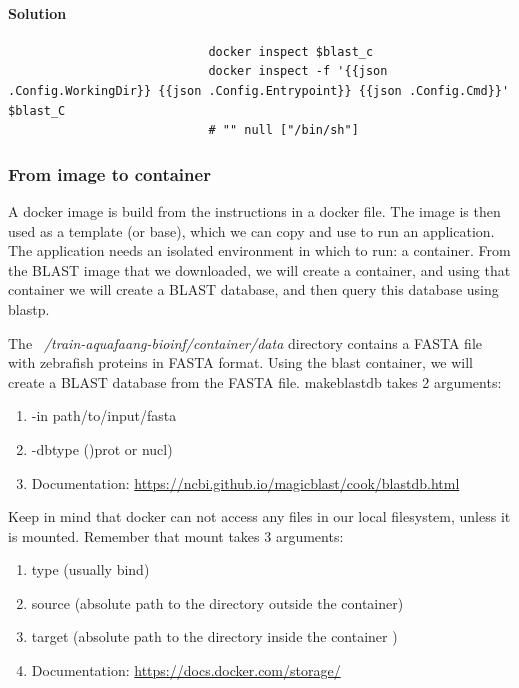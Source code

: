 \documentclass[12pt]{article}
\begin{document}
				\paragraph{Solution}	
					
					\begin{minipage}{\linewidth}
						\begin{lstlisting}
							docker inspect $blast_c 
							docker inspect -f '{{json .Config.WorkingDir}} {{json .Config.Entrypoint}} {{json .Config.Cmd}}' $blast_C
							# "" null ["/bin/sh"]
						\end{lstlisting}
				\end{minipage}
		
			\subsubsection{From image to container}		
				A docker image is build from the instructions in a docker file.  			
				The image is then used as a template (or base), which we can copy and use to run an application. 
				The application needs an isolated environment in which to run: a container.
				From the BLAST image that we downloaded, we will create a container, and using that container we will create a BLAST database, and then query this database using blastp.
					
				The \textit{~/train-aquafaang-bioinf/container/data} directory contains a FASTA file with zebrafish proteins in FASTA format. 
				Using the blast container, we will create a BLAST database from the FASTA file.
				makeblastdb takes 2 arguments: 
				
				\begin{enumerate}
					\item -in path/to/input/fasta  
					\item -dbtype ()prot or nucl)
					\item Documentation: \url{https://ncbi.github.io/magicblast/cook/blastdb.html}
				\end{enumerate}
				
				Keep in mind that docker can not access any files in our local filesystem, unless it is mounted. 
				Remember that mount takes 3 arguments: 
				\begin{enumerate}
					\item type (usually bind)  
					\item source (absolute path to the directory outside the container)
					\item target (absolute path to the directory inside the container )
					\item Documentation:  \url{https://docs.docker.com/storage/}
				\end{enumerate}
			
\end{document}
